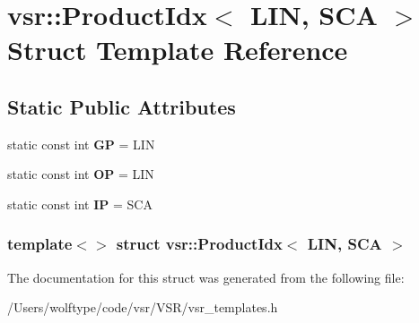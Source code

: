 \hypertarget{structvsr_1_1_product_idx_3_01_l_i_n_00_01_s_c_a_01_4}{\section{vsr\-:\-:Product\-Idx$<$ L\-I\-N, S\-C\-A $>$ Struct Template Reference}
\label{structvsr_1_1_product_idx_3_01_l_i_n_00_01_s_c_a_01_4}
}
\subsection*{Static Public Attributes}
\begin{DoxyCompactItemize}
\item 
\hypertarget{structvsr_1_1_product_idx_3_01_l_i_n_00_01_s_c_a_01_4_a2be7be604c809ccb83d80ac827baec3d}{static const int {\bfseries G\-P} = L\-I\-N}\label{structvsr_1_1_product_idx_3_01_l_i_n_00_01_s_c_a_01_4_a2be7be604c809ccb83d80ac827baec3d}

\item 
\hypertarget{structvsr_1_1_product_idx_3_01_l_i_n_00_01_s_c_a_01_4_ad0f85c573e63139266487d3105b16555}{static const int {\bfseries O\-P} = L\-I\-N}\label{structvsr_1_1_product_idx_3_01_l_i_n_00_01_s_c_a_01_4_ad0f85c573e63139266487d3105b16555}

\item 
\hypertarget{structvsr_1_1_product_idx_3_01_l_i_n_00_01_s_c_a_01_4_a8288570ff825790c41d7ef741cec2246}{static const int {\bfseries I\-P} = S\-C\-A}\label{structvsr_1_1_product_idx_3_01_l_i_n_00_01_s_c_a_01_4_a8288570ff825790c41d7ef741cec2246}

\end{DoxyCompactItemize}
\subsubsection*{template$<$$>$ struct vsr\-::\-Product\-Idx$<$ L\-I\-N, S\-C\-A $>$}



The documentation for this struct was generated from the following file\-:\begin{DoxyCompactItemize}
\item 
/\-Users/wolftype/code/vsr/\-V\-S\-R/vsr\-\_\-templates.\-h\end{DoxyCompactItemize}
